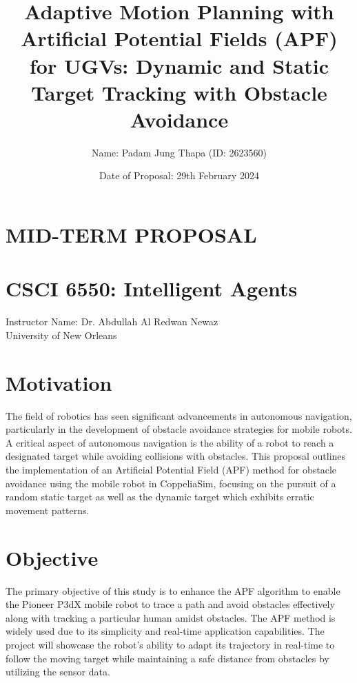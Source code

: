 \documentclass{article}
\title{Adaptive Motion Planning with Artificial Potential Fields (APF) for UGVs: Dynamic and Static Target Tracking with Obstacle Avoidance}
\author{Name: Padam Jung Thapa (ID: 2623560)}
\date{Date of Proposal: 29th February 2024}
\begin{document}
\maketitle

\begin{center}
\section*{MID-TERM PROPOSAL}
\section*{CSCI 6550: Intelligent Agents}

Instructor Name: Dr. Abdullah Al Redwan Newaz \\
University of New Orleans
\end{center}

\section*{Motivation}
The field of robotics has seen significant advancements in autonomous navigation, particularly in the development of obstacle avoidance strategies for mobile robots. A critical aspect of autonomous navigation is the ability of a robot to reach a designated target while avoiding collisions with obstacles. This proposal outlines the implementation of an Artificial Potential Field (APF) method for obstacle avoidance using the mobile robot in CoppeliaSim, focusing on the pursuit of a random static target as well as the dynamic target which exhibits erratic movement patterns.

\section*{Objective}
The primary objective of this study is to enhance the APF algorithm to enable the Pioneer P3dX mobile robot to trace a path and avoid obstacles effectively along with tracking a particular human amidst obstacles. The APF method is widely used due to its simplicity and real-time application capabilities. The project will showcase the robot's ability to adapt its trajectory in real-time to follow the moving target while maintaining a safe distance from obstacles by utilizing the sensor data.
\end{document}

